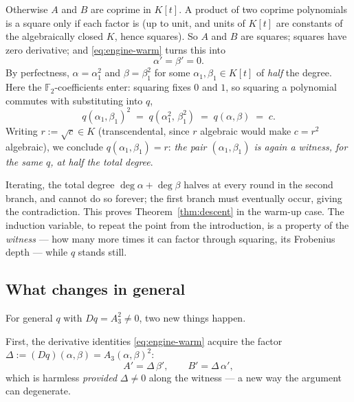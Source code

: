 \documentclass[11pt]{article}
\theoremstyle{definition}
\theoremstyle{remark}
\newcommand{\F}{\mathbb{F}}
\begin{document}
Otherwise $A$ and $B$ are coprime in $K[t]$.  A product of two coprime
polynomials is a square only if each factor is (up to unit, and units
of $K[t]$ are constants of the algebraically closed $K$, hence
squares).  So $A$ and $B$ are squares; squares have zero derivative;
and \eqref{eq:engine-warm} turns this into
\[
  \alpha' = \beta' = 0 .
\]
By perfectness, $\alpha = \alpha_1^2$ and $\beta = \beta_1^2$ for some
$\alpha_1, \beta_1 \in K[t]$ of \emph{half} the degree.  Here the
$\F_2$-coefficients enter: squaring fixes $0$ and $1$, so
squaring a polynomial commutes with substituting into $q$,
\[
  q(\alpha_1, \beta_1)^2
  \;=\; q(\alpha_1^2,\, \beta_1^2)
  \;=\; q(\alpha, \beta) \;=\; c .
\]
Writing $r := \sqrt{c} \in K$ (transcendental, since $r$ algebraic
would make $c = r^2$ algebraic), we conclude
$q(\alpha_1, \beta_1) = r$: \emph{the pair $(\alpha_1, \beta_1)$ is
again a witness, for the same $q$, at half the total degree}.

Iterating, the total degree $\deg\alpha + \deg\beta$ halves at every
round in the second branch, and cannot do so forever; the first branch
must eventually occur, giving the contradiction.  This proves
Theorem~\ref{thm:descent} in the warm-up case.  The induction
variable, to repeat the point from the introduction, is a property of
the \emph{witness} --- how many more times it can factor through
squaring, its Frobenius depth --- while $q$ stands still.

\subsection{What changes in general}

For general $q$ with $Dq = A_3^2 \neq 0$, two new things happen.

First, the derivative identities \eqref{eq:engine-warm} acquire the factor
$\Delta := (Dq)(\alpha,\beta) = A_3(\alpha,\beta)^2$:
\[
  A' = \Delta\,\beta', \qquad B' = \Delta\,\alpha',
\]
which is harmless \emph{provided} $\Delta \neq 0$ along the witness
--- a new way the argument can degenerate.
\end{document}
